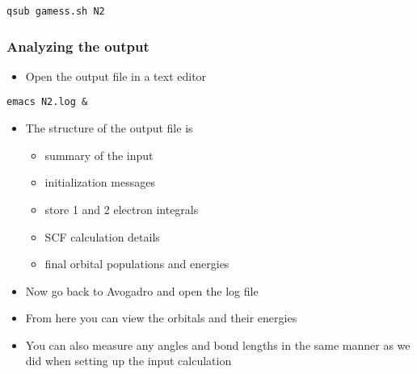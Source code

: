 \documentclass[11pt]{article}
\begin{document}
\begin{verbatim}
qsub gamess.sh N2
\end{verbatim}

\subsubsection{Analyzing the output}
\label{sec:org4c9c542}

\begin{itemize}
\item Open the output file in a text editor
\end{itemize}

\begin{verbatim}
emacs N2.log &
\end{verbatim}

\begin{itemize}
\item The structure of the output file is
\begin{itemize}
\item summary of the input
\item initialization messages
\item store 1 and 2 electron integrals
\item SCF calculation details
\item final orbital populations and energies
\end{itemize}

\item Now go back to Avogadro and open the log file

\item From here you can view the orbitals and their energies

\item You can also measure any angles and bond lengths in the same manner as we did when setting up the input calculation
\end{itemize}
\end{document}
